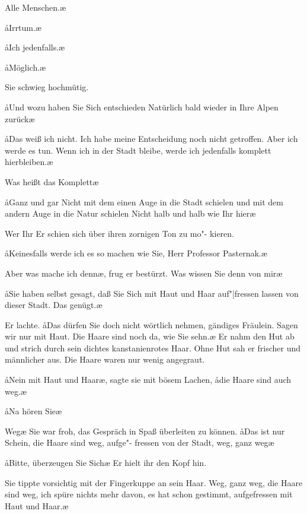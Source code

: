 \aanah{}Alle Menschen.\ae{}

\aa{}Irrtum.\ae{}

\aa{}Ich jedenfalls.\ae{}

\aa{}Möglich.\ae{}

Sie schwieg hochmütig.

\aa{}Und wozu haben Sie Sich\eingriff{eS76-1}{Sich ] sich} entschieden\frag{} Natürlich bald wieder
in Ihre Alpen zurück\frag{}\ae{}

\aa{}Das weiß ich nicht. Ich habe meine Entscheidung noch nicht
getroffen. Aber ich werde es tun. Wenn ich in der Stadt bleibe,
werde ich jedenfalls komplett hierbleiben.\ae{}

\aanah{}Was heißt das\frag{} Komplett\frag{}\ae{}

\aa{}Ganz und gar\ausr{} Nicht mit dem einen Auge in die Stadt
schielen und mit dem andern Auge in die Natur schielen\ausr{}
Nicht halb und halb wie Ihr hier\ausr{}\ae{}

\aanah{}Wer Ihr\frag{} Er schien sich über ihren zornigen Ton zu mo"-%
kieren.

\aa{}Keinesfalls werde ich es so machen wie Sie, Herr Professor
Pasternak.\ae{}

\aanah{}Aber was mache ich denn\frag{}\ae{}, frug er bestürzt. \aanah{}Was wissen
Sie denn von mir\frag{}\ae{}

\aa{}Sie haben selbst gesagt, daß Sie Sich\eingriff{eS76-2}{Sich ] sich} mit Haut und Haar
auf"|fressen lassen von dieser Stadt. Das genügt.\ae{}

Er lachte. \aa{}Das dürfen Sie doch nicht wörtlich nehmen,
gändiges Fräulein. Sagen wir nur \haa{}mit Haut\hae{}. Die Haare
sind noch da, wie Sie sehn.\ae{} Er nahm den Hut ab und strich
durch sein dichtes kanstanienrotes Haar. Ohne Hut sah er frischer
und männlicher aus. Die Haare waren nur wenig angegraut.

\aa{}Nein mit Haut und Haar\ae{},\eingriff{eS76-3}{Haar\ae{}, ] Haar,\ae{}} sagte sie mit bösem Lachen, \aa{}die
Haare sind auch weg.\ae{}

\aa{}Na hören Sie\ausr{}\ae{}

\aanah{}Weg\ausr{}\ae{} Sie war froh, das Gespräch in Spaß überleiten zu
können. \aa{}Das ist nur Schein, die Haare sind weg, aufge"-%
fressen von der Stadt, weg, ganz weg\ausr{}\ae{}

\aa{}Bitte, überzeugen Sie Sich\eingriff{eS77-1}{Sich ] sich}\ausr{}\ae{} Er hielt ihr den Kopf hin.

Sie tippte vorsichtig mit der Fingerkuppe an sein Haar.
\aanah{}Weg, ganz weg, die Haare sind weg, ich spüre nichts mehr
davon, es hat schon gestimmt, aufgefressen mit Haut und
Haar.\ae{}

